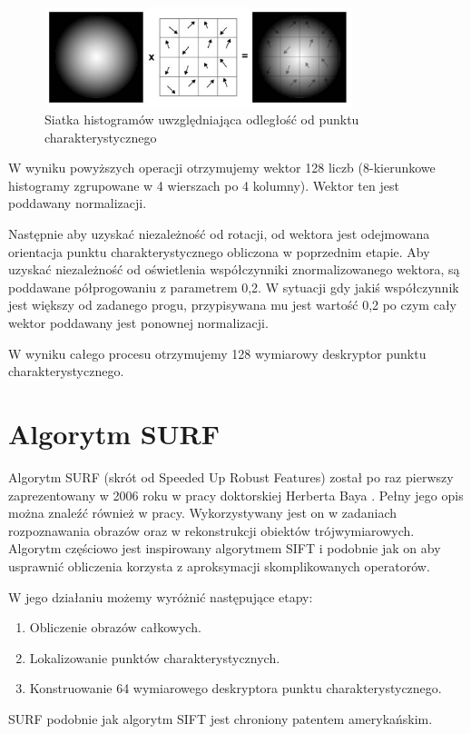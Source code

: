 \begin{figure}[!htb]
\centering
\includegraphics[width=0.8\textwidth]{pict/02/sift/sift_ais_des.jpg}
\caption{Siatka histogramów uwzględniająca odległość od punktu charakterystycznego}
\label{fig:sift_ais_des}
\end{figure}

W wyniku powyższych operacji otrzymujemy wektor 128 liczb (8-kierunkowe histogramy zgrupowane w 4 wierszach po 4 kolumny). Wektor ten jest poddawany normalizacji. 

Następnie aby uzyskać niezależność od rotacji, od wektora jest odejmowana orientacja punktu charakterystycznego obliczona w poprzednim etapie. Aby uzyskać niezależność od oświetlenia współczynniki znormalizowanego wektora, są poddawane półprogowaniu z parametrem 0,2. W sytuacji gdy jakiś współczynnik jest większy od zadanego progu, przypisywana mu jest wartość 0,2 po czym cały wektor poddawany jest ponownej normalizacji.

W wyniku całego procesu otrzymujemy 128 wymiarowy deskryptor punktu charakterystycznego.



\FloatBarrier
\newpage
\section{Algorytm SURF}
Algorytm SURF (skrót od Speeded Up Robust Features) został po raz pierwszy zaprezentowany w 2006 roku w pracy doktorskiej Herberta Baya \cite{HB06}. Pełny jego opis można znaleźć również w pracy\cite{HB08}. Wykorzystywany jest on w zadaniach rozpoznawania obrazów oraz w rekonstrukcji obiektów trójwymiarowych. Algorytm częściowo jest inspirowany algorytmem SIFT i podobnie jak on aby usprawnić obliczenia korzysta z aproksymacji skomplikowanych operatorów. 

W jego działaniu możemy wyróżnić następujące etapy:
\begin{enumerate}
\item{Obliczenie obrazów całkowych.}
\item{Lokalizowanie punktów charakterystycznych.}
\item{Konstruowanie 64 wymiarowego deskryptora punktu charakterystycznego.}
\end{enumerate}
SURF podobnie jak algorytm SIFT jest chroniony patentem amerykańskim.
